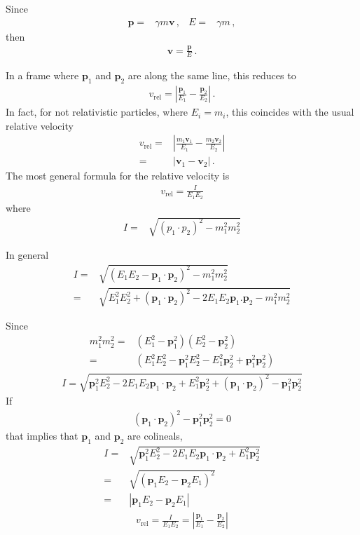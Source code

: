 Since
\begin{align}
  \boldsymbol{p}=&\gamma m \boldsymbol{v} \,,& E=&\gamma m\,,
\end{align}
then
\begin{align}
  \boldsymbol{v}=\frac{\boldsymbol{p}}{E}\,.
\end{align}


In a frame where $\mathbf{p}_1$ and $\mathbf{p}_2$ are along the same line, this reduces to
\begin{align}
  v_{\text{rel}}=\left|
    \frac{\mathbf{p}_1}{E_1}-\frac{\mathbf{p}_2}{E_2}
  \right|\,.
\end{align}
In fact, for not relativistic particles, where $E_i=m_i$, this coincides with the usual relative velocity
\begin{align}
   v_{\text{rel}}=&\left|
    \frac{m_1\mathbf{v}_1}{E_1}-\frac{m_2\mathbf{v}_2}{E_2}
  \right|\nonumber\\
=&\left|
    \mathbf{v}_1-\mathbf{v}_2
  \right|\,.
\end{align}
The most general formula for the relative velocity is 
\begin{align}
  v_{\text{rel}}=\frac{I}{E_1E_2}
\end{align}
where
\begin{align}
  I=&\sqrt{(p_1\cdot p_2)^2-m_1^2m_2^2}  
\end{align}

In general
\begin{align}
  I=&\sqrt{(E_1 E_2-\mathbf{p}_1\cdot\mathbf{p}_2)^2-m_1^2m_2^2}\nonumber\\
  =&\sqrt{E_1^2E_2^2+(\mathbf{p}_1\cdot\mathbf{p}_2)^2-2E_1 E_2\mathbf{p}_1.\mathbf{p}_2 -m_1^2m_2^2}
\end{align}

Since
\begin{align}
  m_1^2m_2^2=&(E_1^2-\mathbf{p}_1^2)(E_2^2-\mathbf{p}_2^2)\nonumber\\
=&(E_1^2E_2^2-\mathbf{p}_1^2E_2^2-E_1^2\mathbf{p}_2^2+\mathbf{p}_1^2\mathbf{p}_2^2)
\end{align}
\begin{align}
  I=\sqrt{\mathbf{p}_1^2E_2^2-2E_1 E_2\mathbf{p}_1\cdot\mathbf{p}_2+E_1^2\mathbf{p}_2^2
+(\mathbf{p}_1\cdot\mathbf{p}_2)^2-
\mathbf{p}_1^2\mathbf{p}_2^2}
\end{align}
If
\begin{align}
  (\mathbf{p}_1\cdot\mathbf{p}_2)^2-
\mathbf{p}_1^2\mathbf{p}_2^2=0
\end{align}
that implies that $\mathbf{p}_1$ and $\mathbf{p}_2$ are colineals,
\begin{align}
  I=&\sqrt{\mathbf{p}_1^2E_2^2-2E_1 E_2\mathbf{p}_1\cdot\mathbf{p}_2+E_1^2\mathbf{p}_2^2}
  \nonumber\\
  =&\sqrt{(\mathbf{p}_1E_2-\mathbf{p}_2E_1)^2}\nonumber\\
  =&|\mathbf{p}_1E_2-\mathbf{p}_2E_1|
\end{align}
\begin{align}
\label{eq:53}
v_{\text{rel}}=  \frac{I}{E_1E_2}=\left|
    \frac{\mathbf{p}_1}{E_1}-\frac{\mathbf{p}_2}{E_2}
  \right|
\end{align}


